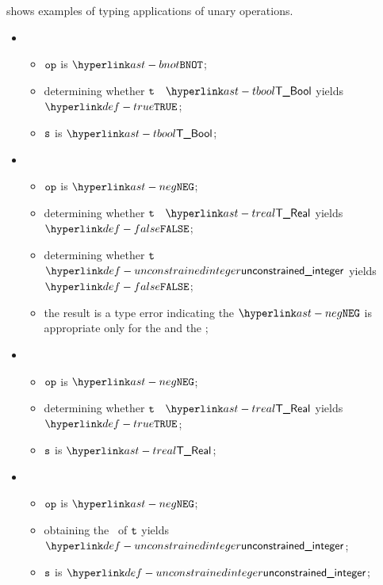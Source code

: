  shows examples of typing applications of unary operations.

\ProseParagraph
\OneApplies
\begin{itemize}
\item {}
  \begin{itemize}
    \item $\texttt{op}$ is $\BNOT$;
    \item determining whether $\texttt{t}$ \typesatisfies\ $\TBool$ yields $\True$\ProseOrTypeError;
    \item $\texttt{s}$ is $\TBool$;
  \end{itemize}

\item {}
\begin{itemize}
  \item $\texttt{op}$ is $\NEG$;
  \item determining whether $\texttt{t}$ \typesatisfies\ $\TReal$ yields $\False$\ProseOrTypeError;
  \item determining whether $\texttt{t}$ \typesatisfies\ $\unconstrainedinteger$ yields $\False$\ProseOrTypeError;
  \item the result is a type error indicating the $\NEG$ is appropriate only for the \realtypeterm{} and the \integertypeterm{};
\end{itemize}

\item {}
\begin{itemize}
  \item $\texttt{op}$ is $\NEG$;
  \item determining whether $\texttt{t}$ \typesatisfies\ $\TReal$ yields $\True$;
  \item $\texttt{s}$ is $\TReal$;
\end{itemize}

\item {}
\begin{itemize}
  \item $\texttt{op}$ is $\NEG$;
  \item obtaining the \wellconstrainedstructure\ of $\texttt{t}$ yields $\unconstrainedinteger$\ProseOrTypeError;
  \item $\texttt{s}$ is $\unconstrainedinteger$;
\end{itemize}


\end{itemize}
